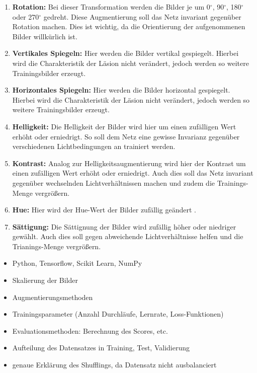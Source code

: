 \begin{enumerate}
    \item \textbf{Rotation:} Bei dieser Transformation werden die Bilder je um 0$^{\circ}$, 90$^{\circ}$, 180$^{\circ}$ oder 270$^{\circ}$ gedreht. Diese Augmentierung soll das Netz invariant gegenüber Rotation machen. Dies ist wichtig, da die Orientierung der aufgenommenen Bilder willkürlich ist.
    \item \textbf{Vertikales Spiegeln:} Hier werden die Bilder vertikal gespiegelt. Hierbei wird die Charakteristik der Läsion nicht verändert, jedoch werden so weitere Trainingsbilder erzeugt. 
    \item \textbf{Horizontales Spiegeln:} Hier werden die Bilder horizontal gespiegelt. Hierbei wird die Charakteristik der Läsion nicht verändert, jedoch werden so weitere Trainingsbilder erzeugt.
    \item \textbf{Helligkeit:} Die Helligkeit der Bilder wird hier um einen zufälligen  Wert erhöht oder erniedrigt. So soll dem Netz eine gewisse Invarianz gegenüber verschiedenen Lichtbedingungen an trainiert werden.
    \item \textbf{Kontrast:} Analog zur Helligkeitsaugmentierung wird hier der Kontrast um einen zufälligen Wert erhöht oder erniedrigt. Auch dies soll das Netz invariant gegenüber wechselnden Lichtverhältnissen machen und zudem die Trainings-Menge vergrößern.
    \item \textbf{Hue:} Hier wird der Hue-Wert der Bilder zufällig geändert . 
    \item \textbf{Sättigung:} Die Sättignung der Bilder wird zufällig höher oder niedriger gewählt. Auch dies soll gegen abweichende Lichtverhältnisse helfen und die Trianings-Menge vergrößern.
\end{enumerate}



\begin{itemize}
	\item Python, Tensorflow, Scikit Learn, NumPy
	\item Skalierung der Bilder
	\item Augmentierungsmethoden
	\item Trainingsparameter (Anzahl Durchläufe, Lernrate, Loss-Funktionen)
	\item Evaluationsmethoden: Berechnung des Scores, etc.
	\item Aufteilung des Datensatzes in Training, Test, Validierung
	\item genaue Erklärung des Shufflings, da Datensatz nicht ausbalanciert
\end{itemize}

